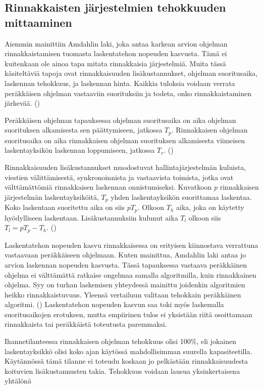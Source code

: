 \subsection{Rinnakkaisten järjestelmien tehokkuuden mittaaminen}

Aiemmin mainittiin Amdahlin laki, joka antaa karkean arvion ohjelman
rinnakkaistamisen tuomasta laskentatehon nopeuden kasvusta. Tämä ei kuitenkaan
ole ainoa tapa mitata rinnakkaisia järjestelmiä. Muita tässä käsiteltäviä tapoja
ovat rinnakkaisuuden lisäkustannukset, ohjelman suoritusaika, laskennan
tehokkuus, ja laskennan hinta. Kaikkia tuloksia voidaan verrata peräkkäisen
ohjelman vastaaviin suorituksiin ja todeta, onko rinnakkaistaminen järkevää.
(\citealt{intro})

Peräkkäisen ohjelman tapauksessa ohjelman suoritusaika on aika ohjelman
suorituksen alkamisesta sen päättymiseen, jatkossa $T_p$. Rinnakkaisen
ohjelman suoritusaika on aika rinnakkaisen ohjelman suorituksen alkamisesta
viimeisen laskentayksikön laskennan loppumiseen, jatkossa $T_r$. (\citealt{intro})

Rinnakkaisuuden lisäkustannukset muodostuvat hallintajärjestelmän kuluista,
viestien välittämisestä, synkronoinnista ja vastaavista toimista, jotka ovat
välttämättömiä rinnakkaisen laskennan onnistumiseksi. Kuvatkoon $p$
rinnakkaisen järjestelmän laskentayksiköitä, $T_p$ yhden laskentayksikön
suorittamaa laskentaa. Koko laskentaan suoritettu aika on siis $pT_p$. Olkoon
$T_h$ aika, joka on käytetty hyödylliseen laskentaan. Lisäkustannuksiin kulunut
aika $T_l$ olkoon siis $T_l = pT_p - T_h$. (\citealt{intro})

Laskentatehon nopeuden kasvu rinnakkaisessa on erityisen kiinnostava verrattuna
vastaavaan peräkkäiseen ohjelmaan. Kuten mainittua, Amdahlin laki antaa jo
arvion laskennan nopeuden kasvusta. Tässä tapauksessa vastaava peräkkäinen ohjelma ei
välttämättä ratkaise ongelmaa samalla algoritmilla, kuin rinnakkainen ohjelma. Syy
on turhan laskemisen yhteydessä mainittu joidenkin algoritmien heikko rinnakkaistuvuus.
Yleensä vertailuun valitaan tehokkain peräkkäinen algoritmi. (\citealt{intro})
Laskentatehon nopeuden kasvun saa toki myös laskemalla suoritusaikojen erotuksen,
mutta empiirinen tulos ei yksistään riitä osoittamaan rinnakkaista tai peräkkäistä
toteutusta paremmaksi.

Ihannetilanteessa rinnakkaisen ohjelman tehokkuus olisi 100\%, eli jokainen
laskentayksikkö olisi koko ajan käytössä mahdollisimman suurella
kapasiteetilla. Käytännössä tämä tilanne ei toteudu koskaan jo pelkästään
rinnakkaisuudesta koituvien lisäkustannusten takia. Tehokkuus voidaan lausua
yksinkertaisena yhtälönä


